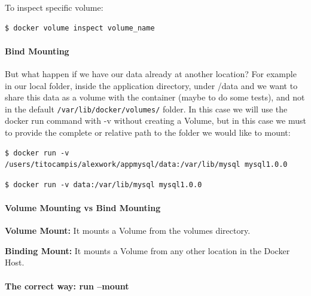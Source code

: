 \documentclass{article}
\newenvironment{codetemplate}[1][]{%
  \mybasecolorbox[#1]
  \itshape
}{%
  \endmybasecolorbox
}
\begin{document}
To inspect specific volume:
\begin{codetemplate}{}
\begin{verbatim}
$ docker volume inspect volume_name
\end{verbatim}
\end{codetemplate}

\paragraph{Bind Mounting}

But what happen if we have our data already at another location? For example in our local folder, inside the application directory, under /data and we want to share this data as a volume with the container (maybe to do some tests), and not in the default \verb|/var/lib/docker/volumes/| folder. In this case we will use the docker run command with -v without creating a Volume, but in this case we must to provide the complete or relative path to the folder we would like to mount:

\begin{codetemplate}{}
\begin{verbatim}
$ docker run -v /users/titocampis/alexwork/appmysql/data:/var/lib/mysql mysql1.0.0
\end{verbatim}
\end{codetemplate}

\begin{codetemplate}{}
\begin{verbatim}
$ docker run -v data:/var/lib/mysql mysql1.0.0
\end{verbatim}
\end{codetemplate}

\paragraph{Volume Mounting vs Bind Mounting}

\textbf{Volume Mount:} It mounts a Volume from the volumes directory.

\textbf{Binding Mount:} It mounts a Volume from any other location in the Docker Host.

\paragraph{The correct way: run --mount}
\end{document}
